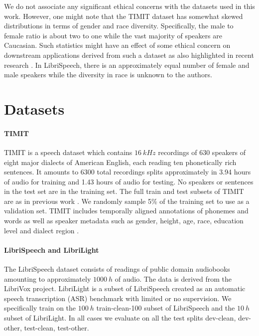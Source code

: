 {We do not associate any significant ethical concerns with the datasets used in this work. However, one might note that the TIMIT dataset has somewhat skewed distributions in terms of gender and race diversity. Specifically, the male to female ratio is about two to one while the vast majority of speakers are Caucasian. Such statistics might have an effect of some ethical concern on downstream applications derived from such a dataset as also highlighted in recent research \parencite{koenecke_racial_2020}. In LibriSpeech, there is an approximately equal number of female and male speakers while the diversity in race is unknown to the authors.


\section{Datasets}\label{app: dataset details}
\paragraph{TIMIT} 
TIMIT \parencite{garofolo_timit_1993} is a speech dataset which contains $\SI{16}{kHz}$ recordings of 630 speakers of eight major dialects of American English, each reading ten phonetically rich sentences. It amounts to 6300 total recordings splits approximately in 3.94 hours of audio for training and 1.43 hours of audio for testing. No speakers or sentences in the test set are in the training set. 
The full train and test subsets of TIMIT are as in previous work \parencite{chung_recurrent_2015, fraccaro_sequential_2016, aksan_stcn_2019}. 
We randomly sample 5\% of the training set to use as a validation set. 
TIMIT includes temporally aligned annotations of phonemes and words as well as speaker metadata such as gender, height, age, race, education level and dialect region \parencite{garofolo_timit_1993}.

\paragraph{LibriSpeech and LibriLight}
The LibriSpeech dataset \parencite{panayotov_librispeech_2015} consists of readings of public domain audiobooks amounting to approximately $\SI{1000}{h}$ of audio. The data is derived from the LibriVox project.
LibriLight \parencite{kahn_libri-light_2020} is a subset of LibriSpeech created as an automatic speech transcription (ASR) benchmark with limited or no supervision.
We specifically train on the $\SI{100}{h}$ \textrm{train-clean-100} subset of LibriSpeech and the $\SI{10}{h}$ subset of LibriLight. 
In all cases we evaluate on all the test splits \textrm{dev-clean}, \textrm{dev-other}, \textrm{test-clean}, \textrm{test-other}.

}
